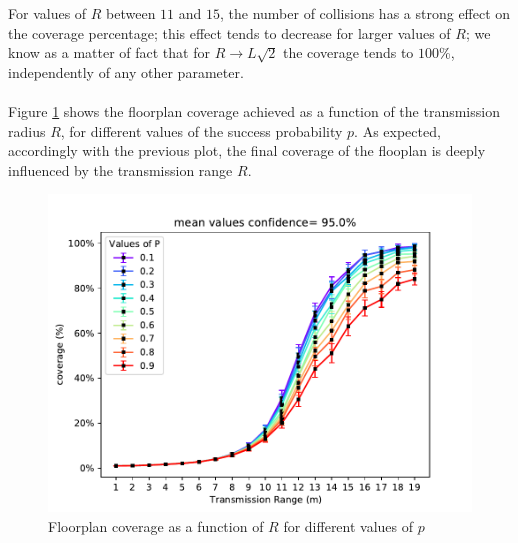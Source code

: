 For values of $R$ between $11$ and $15$, the number of collisions has a strong
effect on the coverage percentage; this effect tends to decrease for larger
values of $R$; we know as a matter of fact that for $R \to L\sqrt{2}$ the
coverage tends to $100$\%, independently of any other parameter.\\
\\
Figure \ref{fig:coverageRP} shows the floorplan coverage achieved as a
function of the transmission radius $R$, for different values of the success probability $p$. As expected, accordingly with the previous plot, the
final coverage of the flooplan is deeply influenced by the transmission range $R$.
\begin{figure}[H]
    \begin{center}
        \includegraphics[scale=.75,trim={0 0 0 0.8cm},clip]{img/big_coverage_r_mean_95.0.pdf}
    \end{center}
    \vspace*{-0.5cm}
    \caption{Floorplan coverage as a function of $R$ for different values of $p$}
    \label{fig:coverageRP}
\end{figure}
\noindent

